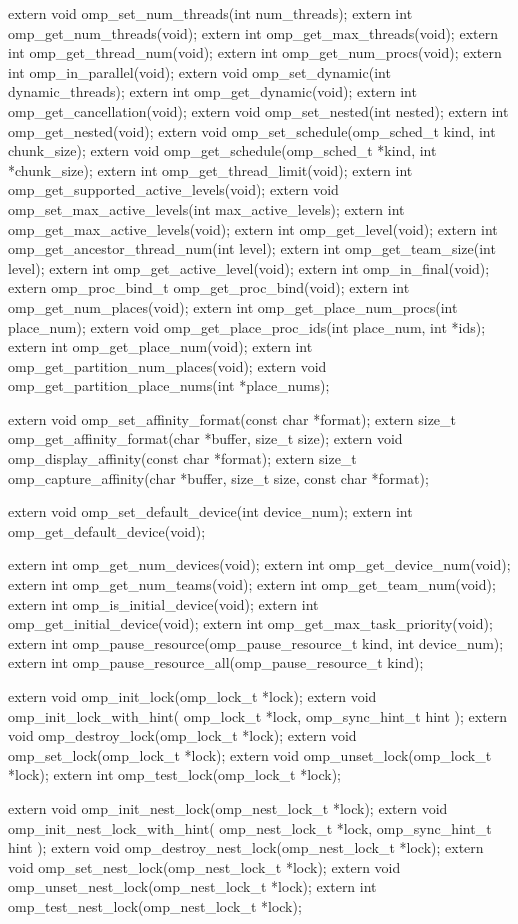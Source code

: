 {\begin{ompcFunction}
{extern void omp_set_num_threads(int num_threads);
extern int omp_get_num_threads(void);
extern int omp_get_max_threads(void);
extern int omp_get_thread_num(void);
extern int omp_get_num_procs(void);
extern int omp_in_parallel(void);
extern void omp_set_dynamic(int dynamic_threads);
extern int omp_get_dynamic(void);
extern int omp_get_cancellation(void);
extern void omp_set_nested(int nested);
extern int omp_get_nested(void);
extern void omp_set_schedule(omp_sched_t kind, int chunk_size);
extern void omp_get_schedule(omp_sched_t *kind, int *chunk_size);
extern int omp_get_thread_limit(void);
extern int omp_get_supported_active_levels(void);
extern void omp_set_max_active_levels(int max_active_levels);
extern int omp_get_max_active_levels(void);
extern int omp_get_level(void);
extern int omp_get_ancestor_thread_num(int level);
extern int omp_get_team_size(int level);
extern int omp_get_active_level(void);
extern int omp_in_final(void);
extern omp_proc_bind_t omp_get_proc_bind(void);
extern int omp_get_num_places(void);
extern int omp_get_place_num_procs(int place_num);
extern void omp_get_place_proc_ids(int place_num, int *ids);
extern int omp_get_place_num(void);
extern int omp_get_partition_num_places(void);
extern void omp_get_partition_place_nums(int *place_nums);

extern void omp_set_affinity_format(const char *format);
extern size_t omp_get_affinity_format(char *buffer, size_t size);
extern void omp_display_affinity(const char *format);
extern size_t omp_capture_affinity(char *buffer, size_t size, const char *format);

extern void omp_set_default_device(int device_num);
extern int omp_get_default_device(void);

extern int omp_get_num_devices(void);
extern int omp_get_device_num(void);
extern int omp_get_num_teams(void);
extern int omp_get_team_num(void);
extern int omp_is_initial_device(void);
extern int omp_get_initial_device(void);
extern int omp_get_max_task_priority(void);
extern int omp_pause_resource(omp_pause_resource_t kind, int device_num);
extern int omp_pause_resource_all(omp_pause_resource_t kind);

extern void omp_init_lock(omp_lock_t *lock);
extern void omp_init_lock_with_hint(
  omp_lock_t *lock,
  omp_sync_hint_t hint
);
extern void omp_destroy_lock(omp_lock_t *lock);
extern void omp_set_lock(omp_lock_t *lock);
extern void omp_unset_lock(omp_lock_t *lock);
extern int omp_test_lock(omp_lock_t *lock);

extern void omp_init_nest_lock(omp_nest_lock_t *lock);
extern void omp_init_nest_lock_with_hint(
  omp_nest_lock_t *lock,
  omp_sync_hint_t hint
);
extern void omp_destroy_nest_lock(omp_nest_lock_t *lock);
extern void omp_set_nest_lock(omp_nest_lock_t *lock);
extern void omp_unset_nest_lock(omp_nest_lock_t *lock);
extern int omp_test_nest_lock(omp_nest_lock_t *lock);

}
\end{ompcFunction}}
